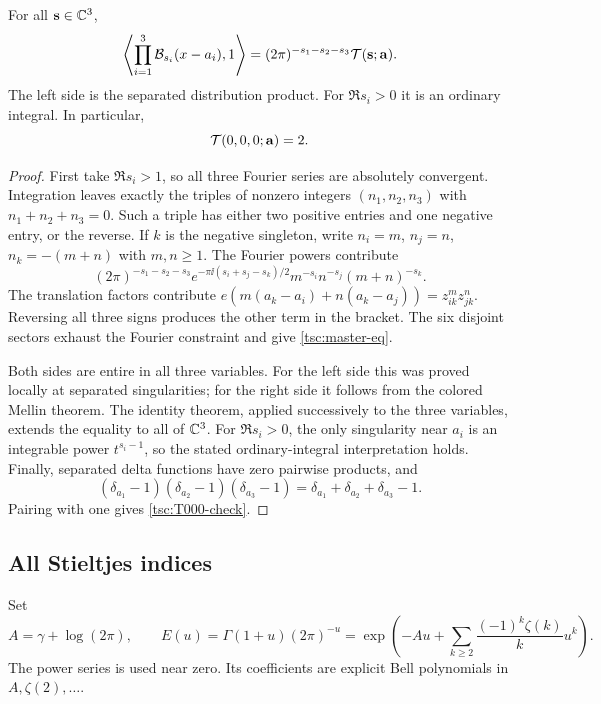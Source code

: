 \begin{theorem}\label{tsc:master}
For all $\mathbf s\in\mathbb C^3$,
\begin{equation}\label{tsc:master-eq}
 \left\langle\prod_{i=1}^3\mathcal B_{s_i}(x-a_i),1\right\rangle
       =(2\pi)^{-s_1-s_2-s_3}\mathcal T(\mathbf s;\mathbf a).
\end{equation}
The left side is the separated distribution product. For $\Re s_i>0$
it is an ordinary integral. In particular,
\begin{equation}\label{tsc:T000-check}
 \mathcal T(0,0,0;\mathbf a)=2.
\end{equation}
\end{theorem}
\begin{proof}
First take $\Re s_i>1$, so all three Fourier series are absolutely
convergent. Integration leaves exactly the triples of nonzero integers
$(n_1,n_2,n_3)$ with $n_1+n_2+n_3=0$. Such a triple has either two
positive entries and one negative entry, or the reverse. If $k$ is the
negative singleton, write $n_i=m$, $n_j=n$, $n_k=-(m+n)$ with $m,n\ge1$.
The Fourier powers contribute
\[
 (2\pi)^{-s_1-s_2-s_3}
   e^{-\pi\ii(s_i+s_j-s_k)/2}
          m^{-s_i}n^{-s_j}(m+n)^{-s_k}.
\]
The translation factors contribute
$e(m(a_k-a_i)+n(a_k-a_j))=z_{ik}^m z_{jk}^n$.
Reversing all three signs produces the other term in the bracket. The
six disjoint sectors exhaust the Fourier constraint and give
\eqref{tsc:master-eq}.

Both sides are entire in all three variables. For the left side this was
proved locally at separated singularities; for the right side it follows
from the colored Mellin theorem. The identity theorem, applied successively
to the three variables, extends the equality to all of $\mathbb C^3$.
For $\Re s_i>0$, the only singularity near $a_i$ is an integrable
power $t^{s_i-1}$, so the stated ordinary-integral interpretation holds.
Finally, separated delta functions have zero pairwise products, and
\[
 (\delta_{a_1}-1)(\delta_{a_2}-1)(\delta_{a_3}-1)
    =\delta_{a_1}+\delta_{a_2}+\delta_{a_3}-1.
\]
Pairing with one gives \eqref{tsc:T000-check}.
\end{proof}

\subsection{All Stieltjes indices}
Set
\begin{equation}\label{tsc:E}
 A=\gamma+\log(2\pi),\qquad
 E(u)=\Gamma(1+u)(2\pi)^{-u}
 =\exp\left(-Au+\sum_{k\ge2}\frac{(-1)^k\zeta(k)}k u^k\right).
\end{equation}
The power series is used near zero. Its coefficients are explicit Bell
polynomials in $A,\zeta(2),\ldots$.

